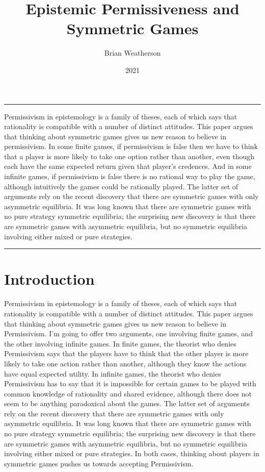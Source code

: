 \documentclass[
  10pt,
  letterpaper,
  DIV=11,
  numbers=noendperiod,
  twoside]{scrartcl}
\title{Epistemic Permissiveness and Symmetric Games}
\author{Brian Weatherson}
\date{2021}
\renewenvironment{abstract}
 {\vspace{-1.25cm}
 \quotation\small\noindent\rule{\linewidth}{.5pt}\par\smallskip
 \noindent }
 {\par\noindent\rule{\linewidth}{.5pt}\endquotation}
\begin{document}
\maketitle
\begin{abstract}
Permissivism in epistemology is a family of theses, each of which says
that rationality is compatible with a number of distinct attitudes. This
paper argues that thinking about symmetric games gives us new reason to
believe in permissivism. In some finite games, if permissivism is false
then we have to think that a player is more likely to take one option
rather than another, even though each have the same expected return
given that player's credences. And in some infinite games, if
permissivism is false there is no rational way to play the game,
although intuitively the games could be rationally played. The latter
set of arguments rely on the recent discovery that there are symmetric
games with only asymmetric equilibria. It was long known that there are
symmetric games with no pure strategy symmetric equilibria; the
surprising new discovery is that there are symmetric games with
asymmetric equilibria, but no symmetric equilibria involving either
mixed or pure strategies.
\end{abstract}

\section{Introduction}\label{introduction}

Permissivism in epistemology is a family of theses, each of which says
that rationality is compatible with a number of distinct attitudes. This
paper argues that thinking about symmetric games gives us new reason to
believe in Permissivism. I'm going to offer two arguments, one involving
finite games, and the other involving infinite games. In finite games,
the theorist who denies Permissivism says that the players have to think
that the other player is more likely to take one action rather than
another, although they know the actions have equal expected utility. In
infinite games, the theorist who denies Permissivism has to say that it
is impossible for certain games to be played with common knowledge of
rationality and shared evidence, although there does not seem to be
anything paradoxical about the games. The latter set of arguments rely
on the recent discovery that there are symmetric games with only
asymmetric equilibria. It was long known that there are symmetric games
with no pure strategy symmetric equilibria; the surprising new discovery
is that there are symmetric games with asymmetric equilibria, but no
symmetric equilibria involving either mixed or pure strategies. In both
cases, thinking about players in symmetric games pushes us towards
accepting Permissivism.
\end{document}
